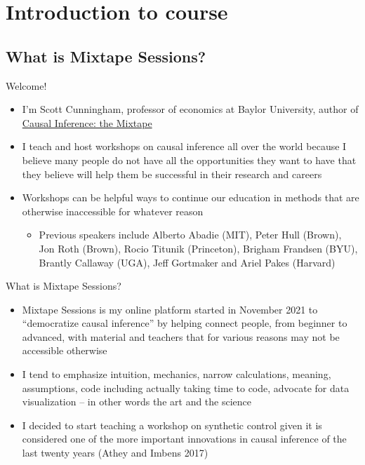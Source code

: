 \documentclass{beamer}
\begin{document}



   

\section{Introduction to course}

\subsection{What is Mixtape Sessions?}


\begin{frame}{Welcome!}

  \begin{itemize}
	\item I'm Scott Cunningham, professor of economics at Baylor University, author of \underline{Causal Inference: the Mixtape}
	\item I teach and host workshops on causal inference all over the world because I believe many people do not have all the opportunities they want to have that they believe will help them be successful in their research and careers 
	\item Workshops can be helpful ways to continue our education in methods that are otherwise inaccessible for whatever reason
		\begin{itemize}
	\item Previous speakers include Alberto Abadie (MIT), Peter Hull (Brown), Jon Roth (Brown), Rocio Titunik (Princeton), Brigham Frandsen (BYU), Brantly Callaway (UGA), Jeff Gortmaker and Ariel Pakes (Harvard)
  \end{itemize}
  \end{itemize}

\end{frame}



\begin{frame}{What is Mixtape Sessions?}

  \begin{itemize}
    \item Mixtape Sessions is my online platform started in November 2021 to ``democratize causal inference'' by helping connect people, from beginner to advanced, with material and teachers that for various reasons may not be accessible otherwise
    \item I tend to emphasize intuition, mechanics, narrow calculations, meaning, assumptions, code including actually taking time to code, advocate for data visualization -- in other words the art and the science
    \item I decided to start teaching a workshop on synthetic control given it is considered one of the more important innovations in causal inference of the last twenty years (Athey and Imbens 2017)
  \end{itemize}

\end{frame}
\end{document}
